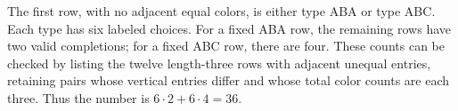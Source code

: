 The first row, with no adjacent equal colors, is either type ABA or type ABC. Each type has six labeled choices. For a fixed ABA row, the remaining rows have two valid completions; for a fixed ABC row, there are four. These counts can be checked by listing the twelve length-three rows with adjacent unequal entries, retaining pairs whose vertical entries differ and whose total color counts are each three. Thus the number is $6\cdot2+6\cdot4=\boxed{36}$.
